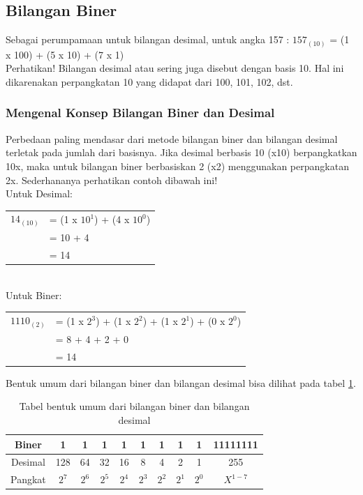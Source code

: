\subsection{Bilangan Biner}
\qquad Sebagai perumpamaan untuk bilangan desimal, untuk angka 157 : $157_{(10)}$ = (1 x 100) + (5 x 10) + (7 x 1) \\

Perhatikan! Bilangan desimal atau sering juga disebut dengan basis 10. Hal ini dikarenakan perpangkatan 10 yang didapat dari 100, 101, 102, dst. 

\subsubsection{Mengenal Konsep Bilangan Biner dan Desimal}
\qquad Perbedaan paling mendasar dari metode bilangan biner dan bilangan desimal terletak pada jumlah dari basisnya. Jika desimal berbasis 10 (x10) berpangkatkan 10x, maka untuk bilangan biner berbasiskan 2 (x2) menggunakan perpangkatan 2x.
Sederhananya perhatikan contoh dibawah ini!\\
Untuk Desimal:
\begin{table}[h!]
\begin{tabular}{ l l }
$14_{(10)}$ & = (1 x $10^1$) + (4 x $10^0$)\\
& = 10 + 4\\
& = 14\\
\end{tabular}
\end{table}
\\
Untuk Biner:
\begin{table}[h!]
\begin{tabular}{ l l }
$1110_{(2)}$ & = (1 x $2^3$) + (1 x $2^2$) + (1 x $2^1$) + (0 x $2^0$)\\
& = 8 + 4 + 2 + 0\\
& = 14\\
\end{tabular}
\end{table}

Bentuk umum dari bilangan biner dan bilangan desimal bisa dilihat pada tabel \ref{table:binerdesimal}. 

\begin{table}[h!]
\centering
\begin{tabular}{ |c|c|c|c|c|c|c|c|c|c| } 
\hline
Biner & 1 & 1 & 1 & 1 & 1 & 1 & 1 & 1 & 11111111 \\ 
\hline
Desimal & 128 & 64 & 32 & 16 & 8 & 4 & 2 & 1 & 255 \\ 
\hline
Pangkat & $2^7$ & $2^6$ & $2^5$ & $2^4$ & $2^3$ & $2^2$ & $2^1$ & $2^0$ & $X^{1-7}$ \\ 
\hline
\end{tabular}
\caption{Tabel bentuk umum dari bilangan biner dan bilangan desimal}
\label{table:binerdesimal}
\end{table}

